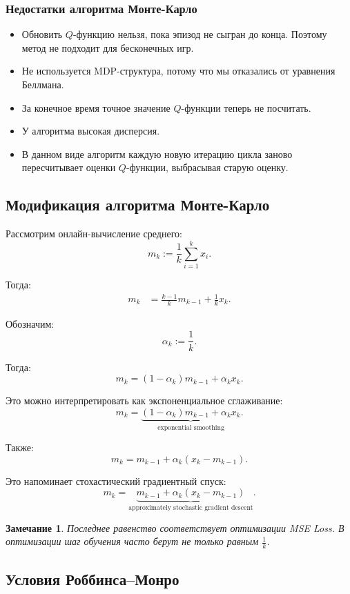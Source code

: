 \documentclass[12pt,a4paper]{article}
\newtheorem{remark}{Замечание}
\begin{document}
\subsubsection{Недостатки алгоритма Монте-Карло}

\begin{itemize}
    \item Обновить $Q$-функцию нельзя, пока эпизод не сыгран до конца. Поэтому метод не подходит для бесконечных игр.
    \item Не используется MDP-структура, потому что мы отказались от уравнения Беллмана.
    \item За конечное время точное значение $Q$-функции теперь не посчитать.
    \item У алгоритма высокая дисперсия.
    \item В данном виде алгоритм каждую новую итерацию цикла заново пересчитывает оценки $Q$-функции, выбрасывая старую оценку.
\end{itemize}

\subsection{Модификация алгоритма Монте-Карло}

Рассмотрим онлайн-вычисление среднего:
\[
m_k
:=
\frac{1}{k}
\sum_{i=1}^{k}
x_i.
\]

Тогда:
\[
\begin{aligned}
m_k
&=
\frac{k-1}{k}m_{k-1}
+
\frac{1}{k}x_k.
\end{aligned}
\]

Обозначим:
\[
\alpha_k := \frac{1}{k}.
\]

Тогда:
\[
m_k
=
(1-\alpha_k)m_{k-1}
+
\alpha_k x_k.
\]

Это можно интерпретировать как экспоненциальное сглаживание:
\[
m_k
=
\underbrace{
(1-\alpha_k)m_{k-1}
+
\alpha_k x_k
}_{\text{exponential smoothing}}.
\]

Также:
\[
m_k
=
m_{k-1}
+
\alpha_k(x_k-m_{k-1}).
\]

Это напоминает стохастический градиентный спуск:
\[
m_k
=
\underbrace{
m_{k-1}
+
\alpha_k(x_k-m_{k-1})
}_{\text{approximately stochastic gradient descent}}.
\]

\begin{remark}
Последнее равенство соответствует оптимизации MSE Loss. В оптимизации шаг обучения часто берут не только равным $\frac{1}{k}$.
\end{remark}

\subsection{Условия Роббинса--Монро}
\end{document}
